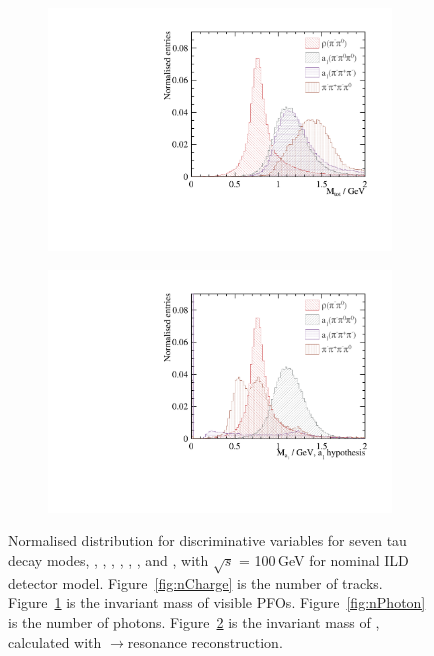 \documentclass[a4paper,11pt]{article}
\newcommand{\decayElectron}{\Pem\PAGne\PGnGt}
\newcommand{\decayMuon}{\PGmm\PAGnGm\PGnGt}
\newcommand{\decayPion}{\PGpm\PGnGt}
\newcommand{\decayRho}{\PGrP{\PGpm\PGpz}\PGnGt}
\newcommand{\decayAiPhoton}{\PaDoP{\PGpm\PGpz\PGpz}\PGnGt}
\newcommand{\decayAiPion}{\PaDoP{\PGpm\PGpm\PGpp}\PGnGt}
\newcommand{\decayThreePionPhoton}{\PGpm\PGpm\PGpp\PGpz\PGnGt}
\newcommand{\decayAiPhotonShort}{\PaDoP{\PGpm\PGpz\PGpz}}
\newcommand{\AiPhotonDecay}{\PaDoP{1260}$\to$\PGpm\PGpz\PGpz}
\newcommand{\rootS}{\ensuremath{\sqrt{s}} }
\begin{document}
\begin{figure}[!tbp]
\begin{subfigure}[b]{0.45\textwidth}
 \includegraphics[width=\textwidth]{plots/var2/mVis_100GeV_improved_zoom}
  \caption{}
  \label{fig:mVis}
\end{subfigure}
\begin{subfigure}[b]{0.45\textwidth}
 \includegraphics[width=\textwidth]{plots/var2/mA1A1Fit_100GeV_improved_zoom}
  \caption{}
  \label{fig:mA1}
\end{subfigure}

\caption{Normalised distribution for discriminative variables for seven tau decay modes, \decayElectron, \decayMuon, \decayPion, \decayRho, \decayAiPhoton, \decayAiPion, and \decayThreePionPhoton,  with \rootS = 100\,GeV for nominal ILD detector model. Figure~\ref{fig:nCharge} is the number of tracks. Figure~\ref{fig:mVis} is the invariant mass of visible PFOs.  Figure~\ref{fig:nPhoton} is the number of photons. Figure~\ref{fig:mA1} is the invariant mass of \decayAiPhotonShort, calculated with \AiPhotonDecay resonance reconstruction. 
}
\label{fig:var} 
\end{figure}
\end{document}
